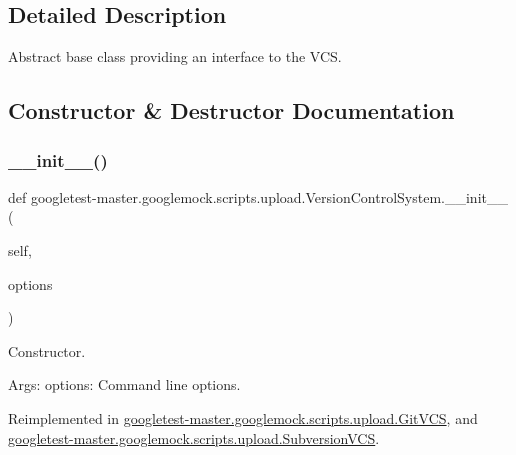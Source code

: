 \subsection{Detailed Description}
\begin{DoxyVerb}Abstract base class providing an interface to the VCS.\end{DoxyVerb}
 

\subsection{Constructor \& Destructor Documentation}
\mbox{\label{classgoogletest-master_1_1googlemock_1_1scripts_1_1upload_1_1_version_control_system_ac11abe4f52d562e0ad112ab345eda7eb}} 
\subsubsection{\texorpdfstring{\_\_init\_\_()}{\_\_init\_\_()}}
{\footnotesize\ttfamily def googletest-\/master.\+googlemock.\+scripts.\+upload.\+Version\+Control\+System.\+\_\+\+\_\+init\+\_\+\+\_\+ (\begin{DoxyParamCaption}\item[{}]{self,  }\item[{}]{options }\end{DoxyParamCaption})}

\begin{DoxyVerb}Constructor.

Args:
  options: Command line options.
\end{DoxyVerb}
 

Reimplemented in \mbox{\hyperlink{classgoogletest-master_1_1googlemock_1_1scripts_1_1upload_1_1_git_v_c_s_a432bf6bdc09ac36b3fc46320e4762167}{googletest-\/master.\+googlemock.\+scripts.\+upload.\+Git\+V\+CS}}, and \mbox{\hyperlink{classgoogletest-master_1_1googlemock_1_1scripts_1_1upload_1_1_subversion_v_c_s_aa558fc2bff9fdd594771654c79edc241}{googletest-\/master.\+googlemock.\+scripts.\+upload.\+Subversion\+V\+CS}}.



